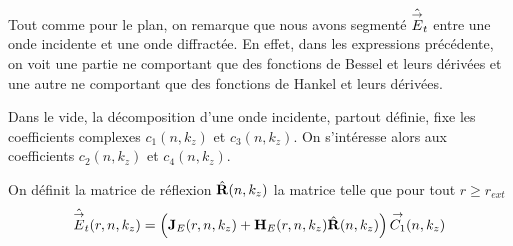     Tout comme pour le plan, on remarque que nous avons segmenté \(\hat{{\overset{\rightarrow}{E}}}_t\) entre une onde incidente et une onde diffractée. En effet, dans les expressions précédente, on voit une partie ne comportant que des fonctions de Bessel et leurs dérivées et une autre ne comportant que des fonctions de Hankel et leurs dérivées.

    Dans le vide, la décomposition d'une onde incidente, partout définie, fixe les coefficients complexes \(c_1(n,k_z)\) et \(c_3(n,k_z)\). On s'intéresse alors aux coefficients \(c_2(n,k_z)\) et \(c_4(n,k_z)\).

    \begin{defn}
      On définit la matrice de réflexion \(\hat{\mathbf{R}}(n,k_z)\) la matrice telle que pour tout \(r\ge r_{ext}\)
      \begin{equation*}
        \hat{{\overset{\rightarrow}{E}}}_t(r,n,k_z) = \left(\mathbf{J}_E(r,n,k_z) + \mathbf{H}_E(r,n,k_z)\hat{\mathbf{R}}(n,k_z) \right){\overset{\rightarrow}{C_1}}(n,k_z)
      \end{equation*}
    \end{defn}

